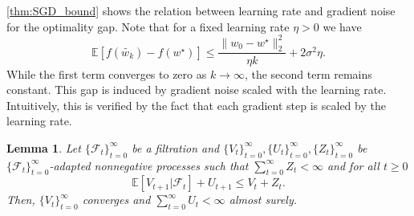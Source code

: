 \documentclass[12pt]{article}
\newtheorem{lemma}[lemma]{Lemma}
\theoremstyle{definition}
\numberwithin{equation}{section}
\newcommand{\E}{\mathbb{E}}
\newcommand{\CF}{\mathcal{F}}
\newcommand{\ev}[1]{\mathbb{E}\left[{#1}\right]}
\newcommand{\norm}[1]{\lVert{#1}\rVert_2}
\begin{document}
\autoref{thm:SGD_bound} shows the relation between learning rate and gradient noise for the optimality gap. Note that for a fixed learning rate $\eta > 0$ we have
\begin{equation*}
  \E [f(\widetilde{w_{k}}) - f(w^\star)] \leq \frac{\norm{w_{0} - w^\star}^2}{\eta k} + 2 \sigma^2 \eta.
\end{equation*}
While the first term converges to zero as $k \rightarrow \infty$, the second term remains constant. This gap is induced by gradient noise scaled with the learning rate. Intuitively, this is verified by the fact that each gradient step is scaled by the learning rate.
\begin{lemma}
  Let $\{\CF_t\}_{t=0}^\infty$ be a filtration and $\{V_t\}_{t=0}^\infty, \{U_t\}_{t=0}^\infty, \{Z_t\}_{t=0}^\infty$ be $\{\CF_t\}_{t=0}^\infty$-adapted nonnegative processes such that $\sum_{t=0}^\infty Z_t < \infty$ and for all $t \geq 0$
  \begin{equation*}
    \ev{V_{t+1}|\CF_t} + U_{t+1} \leq V_t + Z_t.
  \end{equation*}
  Then, $\{V_t\}_{t=0}^\infty$ converges and $\sum_{t=0}^\infty U_t < \infty$ almost surely.
\end{lemma}
\end{document}
